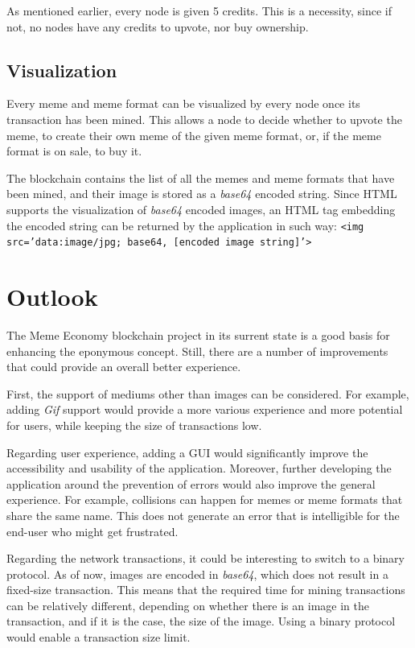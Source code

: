 \documentclass[12pt]{article}
\begin{document}
As mentioned earlier, every node is given 5 credits. This is a
necessity, since if not, no nodes have any credits to upvote, nor buy
ownership.

\subsection{Visualization} %
Every meme and meme format can be visualized by every node once its transaction has been mined. This allows a node to decide whether to upvote the meme, to create their own meme of the given meme format, or, if the meme format is on sale, to buy it.

The blockchain contains the list of all the memes and meme formats that have been mined, and their image is stored as a \textit{base64} encoded string. Since HTML supports the visualization of \textit{base64} encoded images, an HTML tag embedding the encoded string can be returned by the application in such way: {\tt <img src='data:image/jpg; base64, [encoded image string]'>}

\section{Outlook} \label{sec:Outlook} %
The Meme Economy blockchain project in its surrent state is a good basis for enhancing the eponymous concept. Still, there are a number of improvements that could provide an overall better experience.

First, the support of mediums other than images can be considered. For example, adding \textit{Gif} support would provide a more various experience and more potential for users, while keeping the size of transactions low.

Regarding user experience, adding a \ac{GUI} would significantly improve the accessibility and usability of the application. Moreover, further developing the application around the prevention of errors would also improve the general experience. For example, collisions can happen for memes or meme formats that share the same name. This does not generate an error that is intelligible for the end-user who might get frustrated.

Regarding the network transactions, it could be interesting to switch to a binary protocol. As of now, images are encoded in \textit{base64}, which does not result in a fixed-size transaction. This means that the required time for mining transactions can be relatively different, depending on whether there is an image in the transaction, and if it is the case, the size of the image. Using a binary protocol would enable a transaction size limit.
\end{document}
